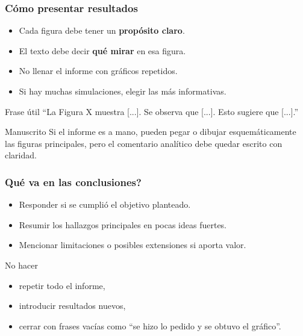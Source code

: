 \begin{frame}
\frametitle{C\'omo presentar resultados}
\begin{itemize}
    \item Cada figura debe tener un \textbf{prop\'osito claro}.
    \item El texto debe decir \textbf{qu\'e mirar} en esa figura.
    \item No llenar el informe con gr\'aficos repetidos.
    \item Si hay muchas simulaciones, elegir las m\'as informativas.
\end{itemize}

\vspace{0.2cm}
\begin{block}{Frase \'util}
``La Figura X muestra [...]. Se observa que [...]. Esto sugiere que [...].''
\end{block}

\vspace{0.2cm}
\begin{alertblock}{Manuscrito}
Si el informe es a mano, pueden pegar o dibujar esquem\'aticamente las figuras principales, pero el comentario anal\'itico debe quedar escrito con claridad.
\end{alertblock}
\end{frame}

\begin{frame}
\frametitle{\textquestiondown{}Qu\'e va en las conclusiones?}
\begin{itemize}
    \item Responder si se cumpli\'o el objetivo planteado.
    \item Resumir los hallazgos principales en pocas ideas fuertes.
    \item Mencionar limitaciones o posibles extensiones si aporta valor.
\end{itemize}

\vspace{0.2cm}
\begin{block}{No hacer}
\begin{itemize}
    \item repetir todo el informe,
    \item introducir resultados nuevos,
    \item cerrar con frases vac\'ias como ``se hizo lo pedido y se obtuvo el gr\'afico''.
\end{itemize}
\end{block}
\end{frame}

